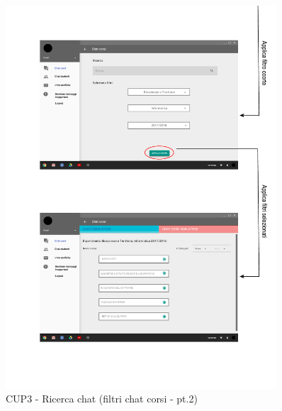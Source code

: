 \begin{figure}
	\centering
	\includegraphics[width=0.9\textwidth]{imgs/gruppo6/activities/act_cup3_filtro_chat_corsi2.pdf}
	\caption{CUP3 - Ricerca chat (filtri chat corsi - pt.2)}
	\label{fig:act-cup3-2}
\end{figure}

